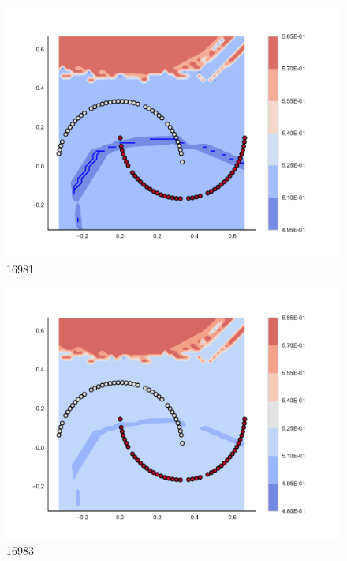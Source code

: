 \begin{subfigure}[b]{0.09\textwidth}
    \includegraphics[clip, trim=2.35cm 1.75cm 4.5cm 0cm,width=\textwidth]{img/convergence/16981.pdf}
    \caption{16981}
    \label{fig:convergence_16981}
\end{subfigure}
%
\begin{subfigure}[b]{0.09\textwidth}
    \includegraphics[clip, trim=2.35cm 1.75cm 4.5cm 0cm,width=\textwidth]{img/convergence/16983.pdf}
    \caption{16983}
    \label{fig:convergence_16983}
\end{subfigure}
%
